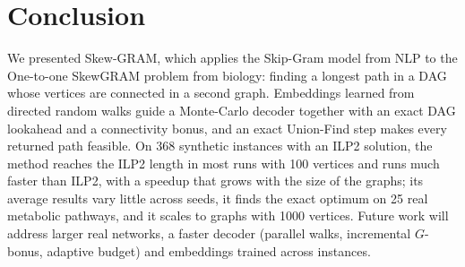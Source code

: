 \documentclass{llncs}
\begin{document}
\section{Conclusion}

We presented Skew-GRAM, which applies the Skip-Gram model from NLP to the One-to-one SkewGRAM problem from biology: finding a longest path in a DAG whose vertices are connected in a second graph. Embeddings learned from directed random walks guide a Monte-Carlo decoder together with an exact DAG lookahead and a connectivity bonus, and an exact Union-Find step makes every returned path feasible. On 368 synthetic instances with an ILP2 solution, the method reaches the ILP2 length in most runs with 100 vertices and runs much faster than ILP2, with a speedup that grows with the size of the graphs; its average results vary little across seeds, it finds the exact optimum on 25 real metabolic pathways, and it scales to graphs with 1000 vertices. Future work will address larger real networks, a faster decoder (parallel walks, incremental $G$-bonus, adaptive budget) and embeddings trained across instances.

\end{document}
